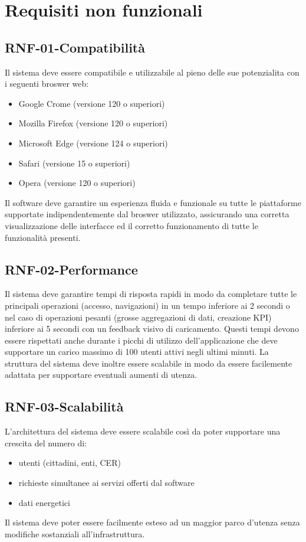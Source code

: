 \setcounter{section}{2}
\setlength{\parindent}{0pt}  %
\setlength{\parskip}{6pt}
\section{Requisiti non funzionali}
\subsection*{RNF-01-Compatibilità}
Il sistema deve essere compatibile e utilizzabile al pieno delle sue potenzialita
con i seguenti broswer web:
\begin{itemize}
    \item Google Crome (versione 120 o superiori)
    \item Mozilla Firefox (versione 120 o superiori)
    \item Microsoft Edge (versione 124 o superiori)
    \item Safari (versione 15 o superiori)
    \item Opera (versione 120 o superiori)
\end{itemize}
Il software deve garantire un esperienza fluida e funzionale su tutte le
piattaforme supportate indipendentemente dal broswer utilizzato, assicurando
una corretta visualizzazione delle interfacce ed il corretto
funzionamento di tutte le funzionalità presenti.
\subsection*{RNF-02-Performance}
Il sistema deve garantire tempi di risposta rapidi in modo da completare
tutte le principali operazioni (accesso, navigazioni)
in un tempo inferiore ai 2 secondi o nel caso di operazioni pesanti (grosse aggregazioni di dati, creazione KPI)
inferiore ai 5 secondi con un feedback visivo di caricamento.
Questi tempi devono essere rispettati anche durante i picchi di utilizzo dell'applicazione
che deve supportare un carico massimo di 100 utenti attivi negli ultimi minuti. La struttura del sistema deve 
inoltre essere scalabile in modo da essere facilemente adattata per supportare eventuali
aumenti di utenza.
\subsection*{RNF-03-Scalabilità}
L'architettura del sistema deve essere scalabile così da poter supportare una crescita
del numero di:
\begin{itemize}
    \item utenti (cittadini, enti, CER)
    \item richieste simultanee ai servizi offerti dal software
    \item dati energetici
\end{itemize}
Il sistema deve poter essere facilmente esteso ad un maggior parco d'utenza%
senza modifiche sostanziali all'infrastruttura.
